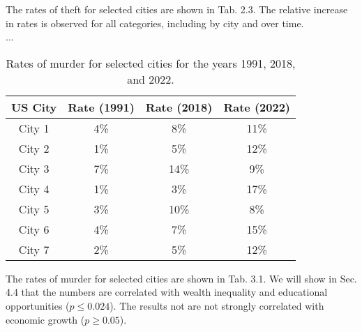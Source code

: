 \documentclass{article}
\begin{document}
The rates of theft for selected cities are shown in Tab. 2.3.  The relative increase in rates is observed for all categories, including by city and over time.
\\
... \\
\begin{table}[ht]
\centering
\begin{tabular}{| c | c | c | c |} \hline
US City & Rate (1991) & Rate (2018) & Rate (2022) \\ \hline
City 1 & 4\% & 8\% & 11\% \\ \hline
City 2 & 1\% & 5\% & 12\% \\ \hline
City 3 & 7\% & 14\% & 9\% \\ \hline
City 4 & 1\% & 3\% & 17\% \\ \hline
City 5 & 3\% & 10\% & 8\% \\ \hline
City 6 & 4\% & 7\% & 15\% \\ \hline
City 7 & 2\% & 5\% & 12\% \\ \hline
\end{tabular}
\caption{\label{tab:2} Rates of murder for selected cities for the years 1991, 2018, and 2022.}
\end{table}

The rates of murder for selected cities are shown in Tab. 3.1.  We will show in Sec. 4.4 that the numbers are correlated with wealth inequality and educational opportunities ($p \leq 0.024$).  The results not are not strongly correlated with economic growth ($p \geq 0.05$).
\end{document}
